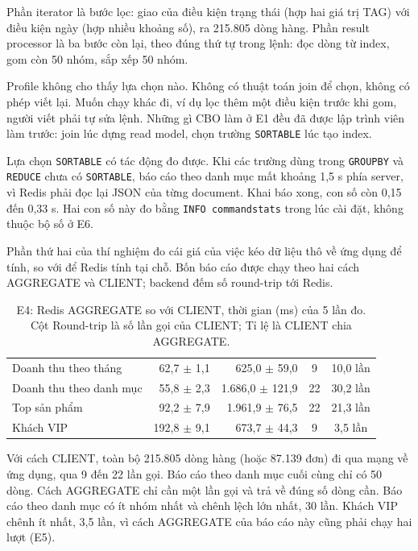 Phần iterator là bước lọc: giao của điều kiện trạng thái (hợp hai giá trị TAG) với điều kiện ngày (hợp nhiều khoảng số), ra 215.805 dòng hàng. Phần result processor là ba bước còn lại, theo đúng thứ tự trong lệnh: đọc dòng từ index, gom còn 50 nhóm, sắp xếp 50 nhóm.

Profile không cho thấy lựa chọn nào. Không có thuật toán join để chọn, không có phép viết lại. Muốn chạy khác đi, ví dụ lọc thêm một điều kiện trước khi gom, người viết phải tự sửa lệnh. Những gì CBO làm ở E1 đều đã được lập trình viên làm trước: join lúc dựng read model, chọn trường \texttt{SORTABLE} lúc tạo index.

Lựa chọn \texttt{SORTABLE} có tác động đo được. Khi các trường dùng trong \texttt{GROUPBY} và \texttt{REDUCE} chưa có \texttt{SORTABLE}, báo cáo theo danh mục mất khoảng 1,5 s phía server, vì Redis phải đọc lại JSON của từng document. Khai báo xong, con số còn 0,15 đến 0,33 s. Hai con số này đo bằng \texttt{INFO commandstats} trong lúc cài đặt, không thuộc bộ số ở E6.

Phần thứ hai của thí nghiệm đo cái giá của việc kéo dữ liệu thô về ứng dụng để tính, so với để Redis tính tại chỗ. Bốn báo cáo được chạy theo hai cách AGGREGATE và CLIENT; backend đếm số round-trip tới Redis.

\begin{table}[!htbp]
\centering
\caption{E4: Redis AGGREGATE so với CLIENT, thời gian (ms) của 5 lần đo. Cột Round-trip là số lần gọi của CLIENT; Tỉ lệ là CLIENT chia AGGREGATE.}\label{tab:q-roundtrip}
\reporttablesetup
\begin{tabularx}{\linewidth}{|L|r|r|c|c|}
\hline
{}
 &  &  &  &  \\ \hline
Doanh thu theo tháng & 62,7 $\pm$ 1,1 & 625,0 $\pm$ 59,0 & 9 & 10,0 lần \\ \hline
Doanh thu theo danh mục & 55,8 $\pm$ 2,3 & 1.686,0 $\pm$ 121,9 & 22 & 30,2 lần \\ \hline
Top sản phẩm & 92,2 $\pm$ 7,9 & 1.961,9 $\pm$ 76,5 & 22 & 21,3 lần \\ \hline
Khách VIP & 192,8 $\pm$ 9,1 & 673,7 $\pm$ 44,3 & 9 & 3,5 lần \\ \hline
\end{tabularx}
\end{table}

Với cách CLIENT, toàn bộ 215.805 dòng hàng (hoặc 87.139 đơn) đi qua mạng về ứng dụng, qua 9 đến 22 lần gọi. Báo cáo theo danh mục cuối cùng chỉ có 50 dòng. Cách AGGREGATE chỉ cần một lần gọi và trả về đúng số dòng cần. Báo cáo theo danh mục có ít nhóm nhất và chênh lệch lớn nhất, 30 lần. Khách VIP chênh ít nhất, 3,5 lần, vì cách AGGREGATE của báo cáo này cũng phải chạy hai lượt (E5).

